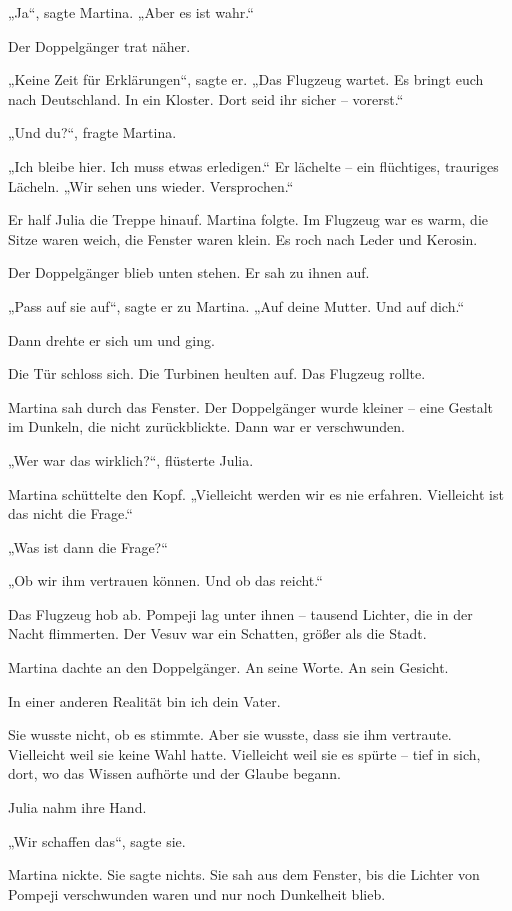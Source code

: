 \documentclass[
]{article}
\begin{document}
„Ja``, sagte Martina. „Aber es ist wahr.``

Der Doppelgänger trat näher.

„Keine Zeit für Erklärungen``, sagte er. „Das Flugzeug wartet. Es bringt euch nach Deutschland. In ein Kloster. Dort seid ihr sicher -- vorerst.``

„Und du?{\kern0pt}``, fragte Martina.

„Ich bleibe hier. Ich muss etwas erledigen.`` Er lächelte -- ein flüchtiges, trauriges Lächeln. „Wir sehen uns wieder. Versprochen.``

Er half Julia die Treppe hinauf. Martina folgte. Im Flugzeug war es warm, die Sitze waren weich, die Fenster waren klein. Es roch nach Leder und Kerosin.

Der Doppelgänger blieb unten stehen. Er sah zu ihnen auf.

„Pass auf sie auf``, sagte er zu Martina. „Auf deine Mutter. Und auf dich.``

Dann drehte er sich um und ging.

Die Tür schloss sich. Die Turbinen heulten auf. Das Flugzeug rollte.

Martina sah durch das Fenster. Der Doppelgänger wurde kleiner -- eine Gestalt im Dunkeln, die nicht zurückblickte. Dann war er verschwunden.

„Wer war das wirklich?{\kern0pt}``, flüsterte Julia.

Martina schüttelte den Kopf. „Vielleicht werden wir es nie erfahren. Vielleicht ist das nicht die Frage.``

„Was ist dann die Frage?{\kern0pt}``

„Ob wir ihm vertrauen können. Und ob das reicht.``

Das Flugzeug hob ab. Pompeji lag unter ihnen -- tausend Lichter, die in der Nacht flimmerten. Der Vesuv war ein Schatten, größer als die Stadt.

Martina dachte an den Doppelgänger. An seine Worte. An sein Gesicht.

In einer anderen Realität bin ich dein Vater.

Sie wusste nicht, ob es stimmte. Aber sie wusste, dass sie ihm vertraute. Vielleicht weil sie keine Wahl hatte. Vielleicht weil sie es spürte -- tief in sich, dort, wo das Wissen aufhörte und der Glaube begann.

Julia nahm ihre Hand.

„Wir schaffen das``, sagte sie.

Martina nickte. Sie sagte nichts. Sie sah aus dem Fenster, bis die Lichter von Pompeji verschwunden waren und nur noch Dunkelheit blieb.
\end{document}
